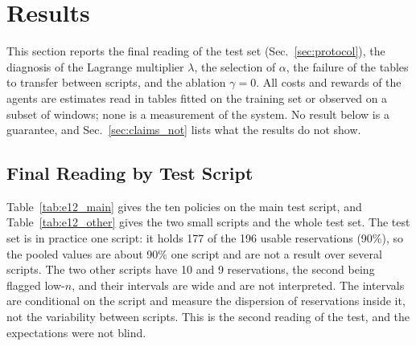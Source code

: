 \section{Results}
\label{sec:results}

This section reports the final reading of the test set (Sec.~\ref{sec:protocol}), the diagnosis of the Lagrange multiplier $\lambda$, the selection of $\alpha$, the failure of the tables to transfer between scripts, and the ablation $\gamma=0$.%
All costs and rewards of the agents are estimates read in tables fitted on the training set or observed on a subset of windows; none is a measurement of the system.%
No result below is a guarantee, and Sec.~\ref{sec:claims_not} lists what the results do not show.%

\subsection{Final Reading by Test Script}
\label{sec:res_e12}

Table~\ref{tab:e12_main} gives the ten policies on the main test script, and Table~\ref{tab:e12_other} gives the two small scripts and the whole test set.%
The test set is in practice one script: it holds 177 of the 196 usable reservations (90\%), so the pooled values are about 90\% one script and are not a result over several scripts.%
The two other scripts have 10 and 9 reservations, the second being flagged low-$n$, and their intervals are wide and are not interpreted.%
The intervals are conditional on the script and measure the dispersion of reservations inside it, not the variability between scripts.%
This is the second reading of the test, and the expectations were not blind.%

